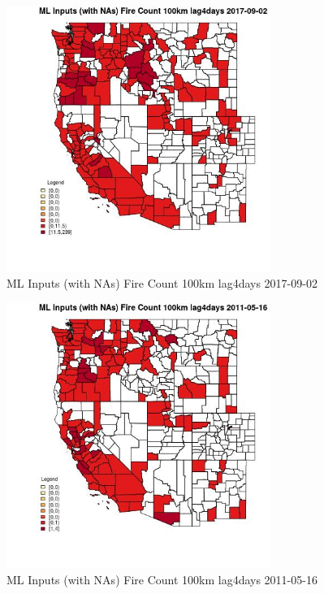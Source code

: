 \clearpage 

\begin{figure} 
\centering  
\includegraphics[width=0.77\textwidth]{Code_Outputs/Report_ML_input_PM25_Step4_part_e_de_duplicated_aves_compiled_2019-05-21wNAs_CountyFire_Count_100km_lag4daysMean2017-09-02.jpg} 
\caption{\label{fig:Report_ML_input_PM25_Step4_part_e_de_duplicated_aves_compiled_2019-05-21wNAsCountyFire_Count_100km_lag4daysMean2017-09-02}ML Inputs (with NAs) Fire Count 100km lag4days 2017-09-02} 
\end{figure} 
 

\begin{figure} 
\centering  
\includegraphics[width=0.77\textwidth]{Code_Outputs/Report_ML_input_PM25_Step4_part_e_de_duplicated_aves_compiled_2019-05-21wNAs_CountyFire_Count_100km_lag4daysMean2011-05-16.jpg} 
\caption{\label{fig:Report_ML_input_PM25_Step4_part_e_de_duplicated_aves_compiled_2019-05-21wNAsCountyFire_Count_100km_lag4daysMean2011-05-16}ML Inputs (with NAs) Fire Count 100km lag4days 2011-05-16} 
\end{figure} 
 

